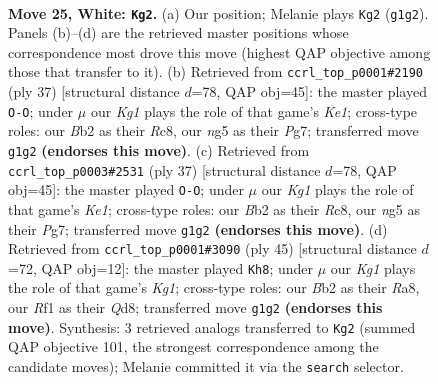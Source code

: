 \documentclass[11pt]{article}
\begin{document}
\clearpage

\begin{figure}[p]\centering
\begin{subfigure}{0.46\textwidth}\centering
\resizebox{\linewidth}{!}{%
\newchessgame
\chessboard[
  setfen={r3qr1k/6b1/1pn5/p1pBPpn1/2P4p/1P1N4/PB1P4/1R1Q1RK1 w - - 2 25},
  showmover=false,
  pgfstyle=straightmove, color=movearrow, markmove={g1-g2}
]}
\caption{}
\end{subfigure}\hfill
\begin{subfigure}{0.46\textwidth}\centering
\resizebox{\linewidth}{!}{%
\newchessgame
\chessboard[
  setfen={2rqk2r/5ppp/pn2p3/1p1b1N2/5PP1/P3Q3/1PP3BP/1K1R2R1 b k - 0 19},
  showmover=false,
  pgfstyle=straightmove, color=movearrow, markmove={e8-g8}
]}
\caption{}
\end{subfigure}
\\[4pt]
\begin{subfigure}{0.46\textwidth}\centering
\resizebox{\linewidth}{!}{%
\newchessgame
\chessboard[
  setfen={2rqk2r/5ppp/pn2p3/1p1b1N2/5PP1/P3Q3/1PP3BP/1K1R2R1 b k - 0 19},
  showmover=false,
  pgfstyle=straightmove, color=movearrow, markmove={e8-g8}
]}
\caption{}
\end{subfigure}\hfill
\begin{subfigure}{0.46\textwidth}\centering
\resizebox{\linewidth}{!}{%
\newchessgame
\chessboard[
  setfen={r2q2k1/2p1bPpp/2n3b1/rp6/5BP1/2Pp1N1P/BP3P2/R2QR1K1 b - - 0 23},
  showmover=false,
  pgfstyle=straightmove, color=movearrow, markmove={g8-h8}
]}
\caption{}
\end{subfigure}
\caption{\textbf{Move 25, White: \texttt{Kg2}.} (a) Our position; Melanie plays \texttt{Kg2} (\texttt{g1g2}). Panels (b)--(d) are the retrieved master positions whose correspondence most drove this move (highest QAP objective among those that transfer to it). (b) Retrieved from \texttt{ccrl\_top\_p0001\#2190} (ply 37) [structural distance $d$=78, QAP obj=45]: the master played \texttt{O-O}; under $\mu$ our \emph{Kg1} plays the role of that game's \emph{Ke1}; cross-type roles: our \emph{B}b2 as their \emph{R}c8, our \emph{n}g5 as their \emph{P}g7; transferred move \texttt{g1g2} \textbf{(endorses this move)}. (c) Retrieved from \texttt{ccrl\_top\_p0003\#2531} (ply 37) [structural distance $d$=78, QAP obj=45]: the master played \texttt{O-O}; under $\mu$ our \emph{Kg1} plays the role of that game's \emph{Ke1}; cross-type roles: our \emph{B}b2 as their \emph{R}c8, our \emph{n}g5 as their \emph{P}g7; transferred move \texttt{g1g2} \textbf{(endorses this move)}. (d) Retrieved from \texttt{ccrl\_top\_p0001\#3090} (ply 45) [structural distance $d$=72, QAP obj=12]: the master played \texttt{Kh8}; under $\mu$ our \emph{Kg1} plays the role of that game's \emph{Kg1}; cross-type roles: our \emph{B}b2 as their \emph{R}a8, our \emph{R}f1 as their \emph{Q}d8; transferred move \texttt{g1g2} \textbf{(endorses this move)}. Synthesis: 3 retrieved analogs transferred to \texttt{Kg2} (summed QAP objective 101, the strongest correspondence among the candidate moves); Melanie committed it via the \texttt{search} selector.}
\label{fig:thought-m48}
\end{figure}
\end{document}
